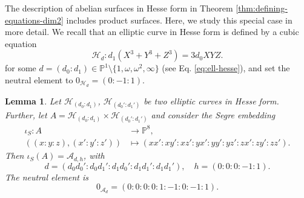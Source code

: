 \documentclass[11pt]{amsart}
\newtheorem{lemma}[theorem]{Lemma}
\theoremstyle{definition}
\newcommand{\A}{\mathcal{A}}
\renewcommand{\H}{\mathcal{H}}
\newcommand{\HH}{\mathcal{H}}
\let \H\HH
\newcommand{\PP}{\mathbb{P}}
\begin{document}
The description of abelian surfaces in Hesse form in Theorem \ref{thm:defining-equations-dim2} includes product surfaces. Here, we study this special case in more detail. We recall that an elliptic curve in Hesse form is defined by a cubic equation
\begin{equation*}
    \H_d: d_1(X^3 + Y^3 + Z^3) = 3d_0 XYZ.
\end{equation*} for some $d = (d_0:d_1) \in \PP^1 \setminus\{1,\omega,\omega^2,\infty\}$ (see Eq. \ref{eq:ell-hesse}), and set the neutral element to $0_{\H_d} = (0:-1:1)$.


\begin{lemma} \label{lem:product-equation}
    Let $\H_{(d_0:d_1)}$, $\H_{(d_0':d_1')}$ be two elliptic curves in Hesse form. Further, let $A = \H_{(d_0:d_1)} \times \H_{(d_0':d_1')}$ and consider the Segre embedding 
    \begin{align*}
    \iota_S: A &\to \PP^8, \\
    \left((x:y:z), (x':y':z') \right) &\mapsto (xx':xy':xz':yx':yy':yz':zx':zy':zz').
    \end{align*}
    Then 
    \(
    \iota_S(A) = \A_{d,h}
    \), with
    \[d = (d_0d_0': d_0d_1': d_1d_0':d_1d_1':d_1d_1'),
    \quad 
    h = (0:0:0:-1:1).
    \]
    The neutral element is
    \[
    0_{\A_d} =  (0:0:0:0:1:-1:0:-1:1).
    \]
\end{lemma}
\end{document}
